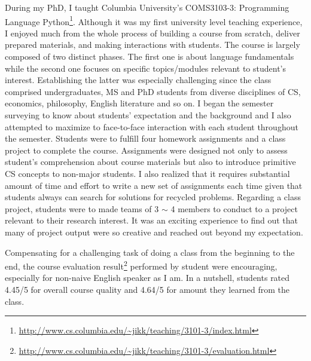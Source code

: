 \documentclass[letterpaper, 10pt]{article}
\begin{document}
\begin{small}
During my PhD, I taught Columbia University's COMS3103-3: Programming Language
Python\footnote{\url{http://www.cs.columbia.edu/~jikk/teaching/3101-3/index.html}}.
%
%
Although it was my first university level teaching experience, I enjoyed much
from the whole process of building a course from scratch, deliver prepared
materials, and making interactions with students.
% 
The course is largely composed of two distinct phases. The first one is about
language fundamentals while the second one focuses on specific topics/modules
relevant to student's interest. Establishing the latter was especially
challenging since the class comprised undergraduates, MS and PhD students from
diverse disciplines of CS, economics, philosophy, English literature and so on.
%
I began the semester surveying to know about students' expectation and the
background and I also attempted to maximize to face-to-face interaction with
each student throughout the semester.
% 
Students were to fulfill four homework assignments and a class project to
complete the course. 
%
Assignments were designed not only to assess student's comprehension about
course materials but also to introduce primitive CS concepts to non-major
students.
%
%
I also realized that it requires  substantial amount of time and effort to
write a new set of assignments each time given that students always can search
for solutions for recycled problems. 
%
Regarding a class project, students were to made teams of 3 $\sim$ 4 members to
conduct to a project relevant to their research interest.
%
It was an exciting experience to find out that many of project output were so
creative and reached out beyond my expectation.
%
%

Compensating for a challenging task of doing a class from the beginning to the
end, the course evaluation
result\footnote{\url{http://www.cs.columbia.edu/~jikk/teaching/3101-3/evaluation.html}}
performed by student were encouraging, especially for non-naive English speaker
as I am. In a nutshell, students rated 4.45/5 for overall course quality and
4.64/5 for amount they learned from the class.


\end{small}
\end{document}
